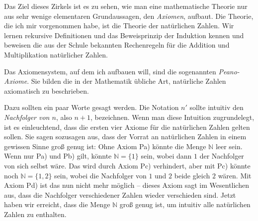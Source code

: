 \documentclass{zusammenfassung}
\begin{document}

Das Ziel dieses Zirkels ist es zu sehen, wie man eine mathematische Theorie nur aus sehr wenige elementaren Grundaussagen, den
\emph{Axiomen}, aufbaut. Die Theorie, die ich mir vorgenommen habe, ist die Theorie der natürlichen Zahlen. Wir lernen rekursive
Definitionen und das Beweisprinzip der Induktion kennen und beweisen die aus der Schule bekannten Rechenregeln für die Addition
und Multiplikation natürlicher Zahlen.

Das Axiomensystem, auf dem ich aufbauen will, sind die sogenannten \emph{Peano-Axiome}. Sie bilden die in der Mathematik
übliche Art, natürliche Zahlen axiomatisch zu beschrieben.


Dazu sollten ein paar Worte gesagt werden. Die Notation $n'$ sollte intuitiv den \emph{Nachfolger von $n$}, also $n+1$,
bezeichnen. Wenn man diese Intuition zugrundelegt, ist es einleuchtend, dass die ersten vier Axiome für die natürlichen Zahlen
gelten sollen. Sie sagen sozusagen aus, dass der Vorrat an natürlichen Zahlen in einem gewissen Sinne groß genug ist: Ohne Axiom
Pa) könnte die Menge $\mathbb N$ leer sein. Wenn nur Pa) und Pb) gilt, könnte $\mathbb N=\{1\}$ sein, wobei dann $1$ der
Nachfolger von sich selbst wäre. Das wird durch Axiom Pc) verhindert, aber mit Pc) könnte noch $\mathbb N=\{1,2\}$ sein, wobei die
Nachfolger von $1$ und $2$ beide gleich $2$ wären. Mit Axiom Pd) ist das nun nicht mehr möglich -- dieses Axiom sagt im
Wesentlichen aus, dass die Nachfolger verschiedener Zahlen wieder verschieden sind. Jetzt haben wir erreicht, dass die Menge
$\mathbb N$ groß genug ist, um intuitiv alle natürlichen Zahlen zu enthalten.
\end{document}
